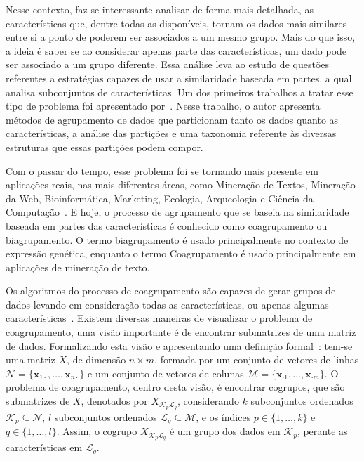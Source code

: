\documentclass[
    12pt,                %
    oneside,            %
    a4paper,            %
    english,            %
    brazil                %
    ]{abntex2ppgsi}
\begin{document}
Nesse contexto, faz-se interessante analisar de forma mais detalhada, as características que, dentre todas as disponíveis, tornam os dados mais similares entre si a ponto de poderem ser associados a um mesmo grupo.
Mais do que isso, a ideia é saber se ao considerar apenas parte das características, um dado pode ser associado a um grupo diferente.
Essa análise leva ao estudo de questões referentes a estratégias capazes de usar a similaridade baseada em partes, a qual analisa subconjuntos de características.
Um dos primeiros trabalhos a tratar esse tipo de problema foi apresentado por~.
Nesse trabalho, o autor apresenta métodos de agrupamento de dados que particionam tanto os dados quanto as características, a análise das partições e uma taxonomia referente às diversas estruturas que essas partições podem compor.

Com o passar do tempo, esse problema foi se tornando mais presente em aplicações reais, nas mais diferentes áreas, como Mineração de Textos, Mineração da Web, Bioinformática, Marketing, Ecologia, Arqueologia e Ciência da Computação~\cite{Govaert2013}.
E hoje, o processo de agrupamento que se baseia na similaridade baseada em partes das características é conhecido como coagrupamento ou biagrupamento.
O termo biagrupamento é usado principalmente no contexto de expressão genética, enquanto o termo Coagrupamento é usado principalmente em aplicações de mineração de texto.

Os algoritmos do processo de coagrupamento são capazes de gerar grupos de dados levando em consideração todas as características, ou apenas algumas características~\cite{Franca2010,Madeira2004}.
Existem diversas maneiras de visualizar o problema de coagrupamento, uma visão importante é de encontrar submatrizes de uma matriz de dados.
Formalizando esta visão e apresentando uma definição formal~\cite{Madeira2004}: tem-se uma matriz $X$, de dimensão $n \times m$, formada por um conjunto de vetores de linhas $\mathcal{N} = \{ \mathbf{x}_{1 \cdot}, \dots, \mathbf{x}_{n \cdot} \}$ e um conjunto de vetores de colunas $\mathcal{M} = \{ \mathbf{x}_{\cdot 1}, \dots, \mathbf{x}_{\cdot m} \}$.
O problema de coagrupamento, dentro desta visão, é encontrar cogrupos, que são submatrizes de $X$, denotados por $X_{\mathcal{K}_p \mathcal{L}_q}$, considerando $k$ subconjuntos ordenados $\mathcal{K}_p \subseteq \mathcal{N}$, $l$ subconjuntos ordenados $\mathcal{L}_q \subseteq \mathcal{M}$, e os índices $p \in \{ 1, \dots, k\}$ e $q \in \{1, \dots, l\}$.
Assim, o cogrupo $X_{\mathcal{K}_p \mathcal{L}_q}$ é um grupo dos dados em $\mathcal{K}_p$, perante as características em $\mathcal{L}_q$.
\end{document}
